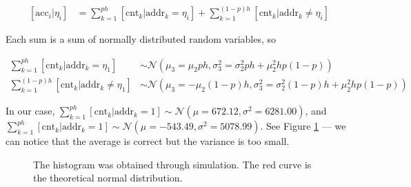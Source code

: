 \documentclass[12pt]{article}
\begin{document}
\begin{align}
\left[ \text{acc}_i|\eta_i \right] &= \sum_{k=1}^{ph} \left[ \text{cnt}_k | \text{addr}_k=\eta_i \right] + \sum_{k=1}^{(1-p)h} \left[ \text{cnt}_k | \text{addr}_k \ne \eta_i \right]
\end{align}

Each sum is a sum of normally distributed random variables, so

\begin{align}
\sum_{k=1}^{ph} \left[ \text{cnt}_k | \text{addr}_k=\eta_1 \right] &\sim \mathcal{N}(\mu_3 = \mu_2 ph, \sigma_3^2 = \sigma_2^2 ph + \mu_2^2 h p(1-p)) \label{eqn:sdm-eta1-addr1} \\
\sum_{k=1}^{(1-p)h} \left[ \text{cnt}_k | \text{addr}_k \ne \eta_1 \right] &\sim \mathcal{N}(\mu_3 = -\mu_2 (1-p)h, \sigma_3^2 = \sigma_2^2 (1-p)h + \mu_2^2 h p (1-p)) \label{eqn:sdm-eta1-addr0}
\end{align}

In our case, $\sum_{k=1}^{ph} \left[ \text{cnt}_k | \text{addr}_k=1 \right] \sim \mathcal{N}(\mu=672.12, \sigma^2=6281.00)$, and $\sum_{k=1}^{ph} \left[ \text{cnt}_k | \text{addr}_k=1 \right] \sim \mathcal{N}(\mu=-543.49, \sigma^2=5078.99)$. See Figure \ref{fig:sdm-read-sums} --- we can notice that the average is correct but the variance is too small.

\begin{figure}[h!]
  \centering

  \caption{The histogram was obtained through simulation. The red curve is the theoretical normal distribution.}
  \label{fig:sdm-read-sums}
\end{figure}
\end{document}
